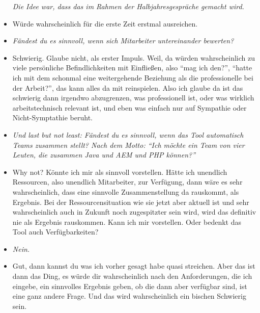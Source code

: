 \begin{itemize}
\textit{Die Idee war, dass das im Rahmen der Halbjahresgespräche gemacht wird.}
\item[] Würde wahrscheinlich für die erste Zeit erstmal ausreichen.

\item[] \textit{Fändest du es sinnvoll, wenn sich Mitarbeiter untereinander bewerten?}
\item[] Schwierig. Glaube nicht, als erster Impuls. Weil, da würden wahrscheinlich zu viele persönliche Befindlichkeiten mit Einfließen, also “mag ich den?”, “hatte ich mit dem schonmal eine weitergehende Beziehung als die professionelle bei der Arbeit?”, das kann alles da mit reinspielen. Also ich glaube da ist das schwierig dann irgendwo abzugrenzen, was professionell ist, oder was wirklich arbeitstechnisch relevant ist, und eben was einfach nur auf Sympathie oder Nicht-Symptathie beruht.

\item[] \textit{Und last but not least: Fändest du es sinnvoll, wenn das Tool automatisch Teams zusammen stellt? Nach dem Motto: “Ich möchte ein Team von vier Leuten, die zusammen Java und AEM und PHP können?”}
\item[] Why not? Könnte ich mir als sinnvoll vorstellen. Hätte ich unendlich Ressourcen, also unendlich Mitarbeiter, zur Verfügung, dann wäre es sehr wahrscheinlich, dass eine sinnvolle Zusammenstellung da rauskommt, als Ergebnis. Bei der Ressourcensituation wie sie jetzt aber aktuell ist und sehr wahrscheinlich auch in Zukunft noch zugespitzter sein wird, wird das definitiv nie als Ergebnis rauskommen. Kann ich mir vorstellen. Oder bedenkt das Tool auch Verfügbarkeiten?

\item[] \textit{Nein.}
\item[] Gut, dann kannst du was ich vorher gesagt habe quasi streichen. Aber das ist dann das Ding, es würde dir wahrscheinlich nach den Anforderungen, die ich eingebe, ein sinnvolles Ergebnis geben, ob die dann aber verfügbar sind, ist eine ganz andere Frage. Und das wird wahrscheinlich ein bischen Schwierig sein.
\end{itemize}



